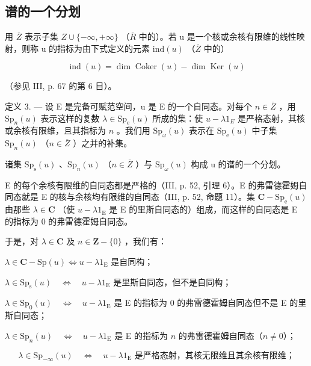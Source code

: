 \subsection{谱的一个分划}

用 \(\overline{Z}\) 表示子集 \(Z \cup \{-\infty, +\infty\}\) （\(\overline{R}\) 中的）。若 u 是一个核或余核有限维的线性映射，则称 u 的指标为由下式定义的元素 \(\text{ind}(u)\) （\(\overline{Z}\) 中的）

\[
\operatorname{ind} (u) = \dim \operatorname{Coker} (u) - \dim \operatorname{Ker} (u)
\]

（参见 III, p. 67 的第 6 目）。

定义 3. --- 设 E 是完备可赋范空间，u 是 E 的一个自同态。对每个 \(n \in \overline{Z}\) ，用 \(\mathrm{Sp}_{n}(u)\) 表示这样的复数 \(\lambda \in \mathrm{Sp}_{\mathrm{e}}(u)\) 所成的集：使 \(u - \lambda1_{E}\) 是严格态射，其核或余核有限维，且其指标为 \(n\) 。我们用 \(\mathrm{Sp}_{\omega}(u)\) 表示在 \(\mathrm{Sp}_{\mathrm{e}}(u)\) 中子集 \(\mathrm{Sp}_{n}(u)\) （\(n \in \overline{Z}\) ）之并的补集。

诸集 \(\mathrm{Sp}_{\mathrm{s}}(u)\) 、\(\mathrm{Sp}_{n}(u)\) （\(n \in \overline{Z}\) ）与 \(\mathrm{Sp}_{\omega}(u)\) 构成 u 的谱的一个分划。

E 的每个余核有限维的自同态都是严格的（III, p. 52, 引理 6）。E 的弗雷德霍姆自同态就是 E 的核与余核均有限维的自同态（III, p. 52, 命题 11）。集 \(\mathbf{C} - \mathrm{Sp}_{\mathrm{e}}(u)\) 由那些 \(\lambda \in \mathbf{C}\) （使 \(u - \lambda 1_{\mathrm{E}}\) 是 E 的里斯自同态的）组成，而这样的自同态是 E 的指标为 0 的弗雷德霍姆自同态。

于是，对 \(\lambda \in \mathbf{C}\) 及 \(n\in \mathbf{Z} - \{0\}\) ，我们有：

\(\lambda \in \mathbf{C} - \mathrm{Sp}(u) \iff u - \lambda 1_{\mathrm{E}}\) 是自同构；

\(\lambda \in \mathrm{Sp}_{\mathrm{s}}(u) \quad \Longleftrightarrow \quad u - \lambda 1_{\mathrm{E}} \text{ 是里斯自同态，但不是自同构；}\)

\(\lambda \in \mathrm{Sp}_{0}(u) \quad \Longleftrightarrow \quad u - \lambda 1_{\mathrm{E}}\) 是 E 的指标为 0 的弗雷德霍姆自同态但不是 E 的里斯自同态；

\(\lambda \in \mathrm{Sp}_n(u) \quad \Longleftrightarrow \quad u - \lambda 1_{\mathrm{E}}\) 是 E 的指标为 \(n\) 的弗雷德霍姆自同态（\(n \neq 0\)）；

\[
\lambda \in \mathrm{Sp} _ {- \infty} (u) \quad \Longleftrightarrow \quad u - \lambda 1 _ {\mathrm{E}} \text{ 是严格态射，其核无限维且其余核有限维；}
\]

